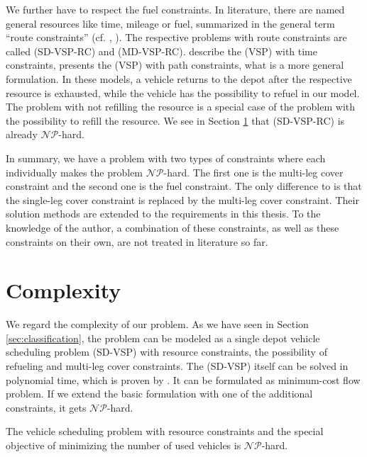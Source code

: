 We further have to respect the fuel constraints. In literature, there are named general resources like time, mileage or fuel, summarized in the general term ``route constraints'' (cf. \cite[p. 16]{Bunte_Kliewer}, \cite{Raff}). The respective problems with route constraints are called (SD-VSP-RC) and (MD-VSP-RC). \cite{Freling_Paixao} describe  the (VSP) with time constraints, \cite{Raff} presents the (VSP) with path constraints, what is a more general formulation. In these models, a vehicle returns to the depot after the respective resource is exhausted, while the vehicle has the possibility to refuel in our model. The problem with not refilling the resource is a special case of the problem with the possibility to refill the resource. We see in Section \ref{sec:complexity} that (SD-VSP-RC) is already $\mathcal{NP}$-hard.

In summary, we have a problem with two types of constraints where each individually makes the problem $\mathcal{NP}$-hard. The first one is the multi-leg cover constraint and the second one is the fuel constraint. The only difference to \cite{Kaiser_Knoll} is that the single-leg cover constraint is replaced by the multi-leg cover constraint. Their solution methods are extended to the requirements in this thesis. To the knowledge of the author, a combination of these constraints, as well as these constraints on their own, are not treated in literature so far.


\section{Complexity}
\label{sec:complexity}

We regard the complexity of our problem. As we have seen in Section \ref{sec:classification}, the problem can be modeled as a single depot vehicle scheduling problem (SD-VSP) with resource constraints, the possibility of refueling and multi-leg cover constraints. The (SD-VSP) itself can be solved in polynomial time, which is proven by \cite{Dantzig_Fulkerson}. It can be formulated as minimum-cost flow problem. If we extend the basic formulation with one of the additional constraints, it gets $\mathcal{NP}$-hard.

\begin{theorem}
\label{th:complexity_VSPRC}

The vehicle scheduling problem with resource constraints and the special objective of minimizing the number of used vehicles is $\mathcal{NP}$-hard.

\end{theorem}

